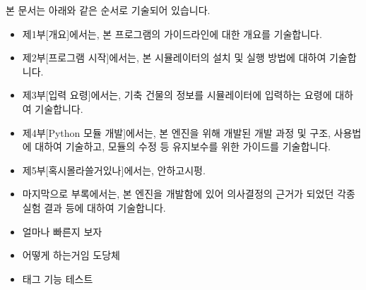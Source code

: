 \documentclass[oneside,openany,a4paper,12pt]{book}
\begin{document}
본 문서는 아래와 같은 순서로 기술되어 있습니다.
\begin{itemize}
  \item 제1부[개요]에서는, 본 프로그램의 가이드라인에 대한 개요를 기술합니다.
  \item 제2부[프로그램 시작]에서는, 본 시뮬레이터의 설치 및 실행 방법에 대하여 기술합니다.
  \item 제3부[입력 요령]에서는, 기축 건물의 정보를 시뮬레이터에 입력하는 요령에 대하여 기술합니다.
  \item 제4부[Python 모듈 개발]에서는, 본 엔진을 위해 개발된  개발 과정 및 구조, 사용법에 대하여 기술하고, 모듈의 수정 등 유지보수를 위한 가이드를 기술합니다.
  \item 제5부[혹시몰라쓸거있나]에서는, 안하고시펑.
  \item 마지막으로 부록에서는, 본 엔진을 개발함에 있어 의사결정의 근거가 되었던 각종 실험 결과 등에 대하여 기술합니다.
  \item 얼마나 빠른지 보자
  \item 어떻게 하는거임 도당체
  \item 태그 기능 테스트
\end{itemize}

\tableofcontents       
\listoffigures          
\listoftables          


\clearpage      
{}

\mainmatter








\backmatter



\end{document}

